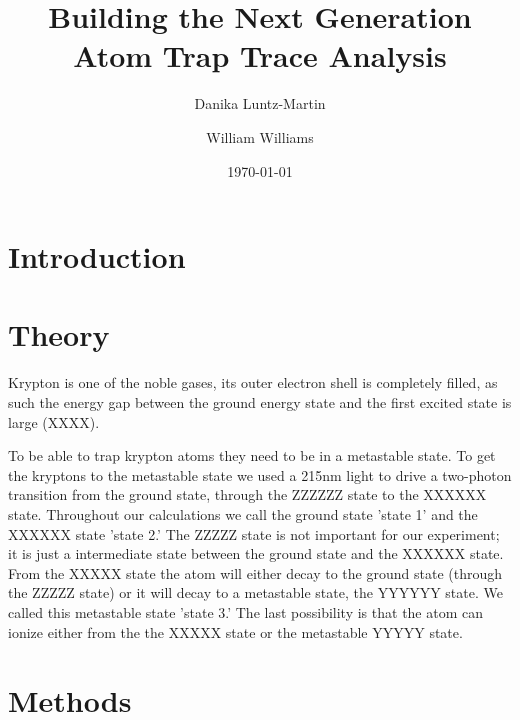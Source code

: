 \documentclass[prb,preprint]{revtex4-1}
\begin{document}
\title{Building the Next Generation Atom Trap Trace Analysis}


\author{Danika Luntz-Martin}

\author{William Williams}

\date{\today}

\begin{abstract}


\end{abstract}


\maketitle 


\section{Introduction} 


\section{Theory}

Krypton is one of the noble gases, its outer electron shell is completely filled, as such the energy gap between the ground energy state and the first excited state is large (XXXX). 

To be able to trap krypton atoms they need to be in a metastable state. To get the kryptons to the metastable state we used a 215nm light to drive a two-photon transition from the ground state, through the ZZZZZZ state to the XXXXXX state. Throughout our calculations we call the ground state 'state 1' and the XXXXXX state 'state 2.' The ZZZZZ state is not important for our experiment; it is just a intermediate state between the ground state and the XXXXXX state. From the XXXXX state the atom will either decay to the ground state (through the ZZZZZ state) or it will decay to a metastable state, the YYYYYY state. We called this metastable state 'state 3.' The last possibility is that the atom can ionize either from the the XXXXX state or the metastable YYYYY state. 

\section{Methods}
\end{document}
